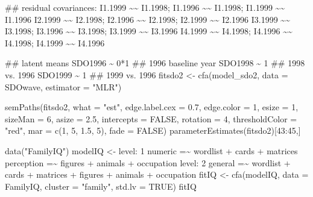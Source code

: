 \documentclass[
]{book}
\newenvironment{Shaded}{\begin{snugshade}}{\end{snugshade}}
\newcommand{\AttributeTok}[1]{\textcolor[rgb]{0.77,0.63,0.00}{#1}}
\newcommand{\ConstantTok}[1]{\textcolor[rgb]{0.00,0.00,0.00}{#1}}
\newcommand{\DecValTok}[1]{\textcolor[rgb]{0.00,0.00,0.81}{#1}}
\newcommand{\FloatTok}[1]{\textcolor[rgb]{0.00,0.00,0.81}{#1}}
\newcommand{\FunctionTok}[1]{\textcolor[rgb]{0.00,0.00,0.00}{#1}}
\newcommand{\NormalTok}[1]{#1}
\newcommand{\OtherTok}[1]{\textcolor[rgb]{0.56,0.35,0.01}{#1}}
\newcommand{\SpecialCharTok}[1]{\textcolor[rgb]{0.00,0.00,0.00}{#1}}
\newcommand{\StringTok}[1]{\textcolor[rgb]{0.31,0.60,0.02}{#1}}
\begin{document}
\begin{Shaded}
\begin{Highlighting}[]
\StringTok{  \#\# residual covariances:}
\StringTok{  I1.1999 \textasciitilde{}\textasciitilde{} I1.1998; I1.1996 \textasciitilde{}\textasciitilde{} I1.1998; I1.1999 \textasciitilde{}\textasciitilde{} I1.1996}
\StringTok{  I2.1999 \textasciitilde{}\textasciitilde{} I2.1998; I2.1996 \textasciitilde{}\textasciitilde{} I2.1998; I2.1999 \textasciitilde{}\textasciitilde{} I2.1996}
\StringTok{  I3.1999 \textasciitilde{}\textasciitilde{} I3.1998; I3.1996 \textasciitilde{}\textasciitilde{} I3.1998; I3.1999 \textasciitilde{}\textasciitilde{} I3.1996}
\StringTok{  I4.1999 \textasciitilde{}\textasciitilde{} I4.1998; I4.1996 \textasciitilde{}\textasciitilde{} I4.1998; I4.1999 \textasciitilde{}\textasciitilde{} I4.1996}

\StringTok{  \#\# latent means}
\StringTok{  SDO1996 \textasciitilde{} 0*1    \#\# 1996 baseline year}
\StringTok{  SDO1998 \textasciitilde{} 1      \#\# 1998 vs. 1996}
\StringTok{  SDO1999 \textasciitilde{} 1      \#\# 1999 vs. 1996}
\StringTok{\textquotesingle{}}
\NormalTok{fitsdo2 }\OtherTok{\textless{}{-}} \FunctionTok{cfa}\NormalTok{(model\_sdo2, }\AttributeTok{data =}\NormalTok{ SDOwave, }\AttributeTok{estimator =} \StringTok{"MLR"}\NormalTok{)}

\FunctionTok{semPaths}\NormalTok{(fitsdo2, }\AttributeTok{what =} \StringTok{"est"}\NormalTok{, }\AttributeTok{edge.label.cex =} \FloatTok{0.7}\NormalTok{, }\AttributeTok{edge.color =} \DecValTok{1}\NormalTok{, }\AttributeTok{esize =} \DecValTok{1}\NormalTok{, }\AttributeTok{sizeMan =} \DecValTok{6}\NormalTok{, }\AttributeTok{asize =} \FloatTok{2.5}\NormalTok{,}
         \AttributeTok{intercepts =} \ConstantTok{FALSE}\NormalTok{, }\AttributeTok{rotation =} \DecValTok{4}\NormalTok{, }\AttributeTok{thresholdColor =} \StringTok{"red"}\NormalTok{, }\AttributeTok{mar =} \FunctionTok{c}\NormalTok{(}\DecValTok{1}\NormalTok{, }\DecValTok{5}\NormalTok{, }\FloatTok{1.5}\NormalTok{, }\DecValTok{5}\NormalTok{), }\AttributeTok{fade =} \ConstantTok{FALSE}\NormalTok{)}
\FunctionTok{parameterEstimates}\NormalTok{(fitsdo2)[}\DecValTok{43}\SpecialCharTok{:}\DecValTok{45}\NormalTok{,]}

\FunctionTok{data}\NormalTok{(}\StringTok{"FamilyIQ"}\NormalTok{)}
\NormalTok{modelIQ }\OtherTok{\textless{}{-}} \StringTok{\textquotesingle{}}
\StringTok{ level: 1}
\StringTok{  numeric =\textasciitilde{} wordlist + cards + matrices}
\StringTok{  perception =\textasciitilde{} figures + animals + occupation}
\StringTok{ level: 2}
\StringTok{  general =\textasciitilde{} wordlist + cards +  matrices + figures + animals +}
\StringTok{             occupation\textquotesingle{}}
\NormalTok{fitIQ }\OtherTok{\textless{}{-}} \FunctionTok{cfa}\NormalTok{(modelIQ, }\AttributeTok{data =}\NormalTok{ FamilyIQ, }\AttributeTok{cluster =} \StringTok{"family"}\NormalTok{, }\AttributeTok{std.lv =} \ConstantTok{TRUE}\NormalTok{)}
\NormalTok{fitIQ}


\end{Highlighting}
\end{Shaded}
\end{document}
